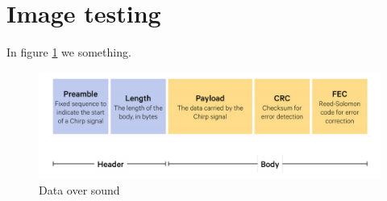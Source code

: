 \section{Image testing}

In figure \ref{fig:dos} we something.

\begin{figure}[!h]
    \includegraphics[width=\linewidth]{res/dos_message.png}
    \caption{Data over sound}
    \label{fig:dos}
\end{figure}
